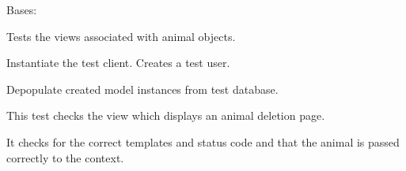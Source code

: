 \documentclass[letterpaper,10pt,english]{sphinxmanual}
\begin{document}

\begin{fulllineitems}
\label{api:mousedb.animal.tests.AnimalViewTests}
Bases: 

Tests the views associated with animal objects.

\begin{fulllineitems}
\label{api:mousedb.animal.tests.AnimalViewTests.fixtures}
\end{fulllineitems}


\begin{fulllineitems}
\label{api:mousedb.animal.tests.AnimalViewTests.setUp}
Instantiate the test client.  Creates a test user.

\end{fulllineitems}


\begin{fulllineitems}
\label{api:mousedb.animal.tests.AnimalViewTests.tearDown}
Depopulate created model instances from test database.

\end{fulllineitems}


\begin{fulllineitems}
\label{api:mousedb.animal.tests.AnimalViewTests.test_animal_delete}
This test checks the view which displays an animal deletion page.

It checks for the correct templates and status code and that the animal is passed correctly to the context.

\end{fulllineitems}



\end{fulllineitems}
\end{document}
